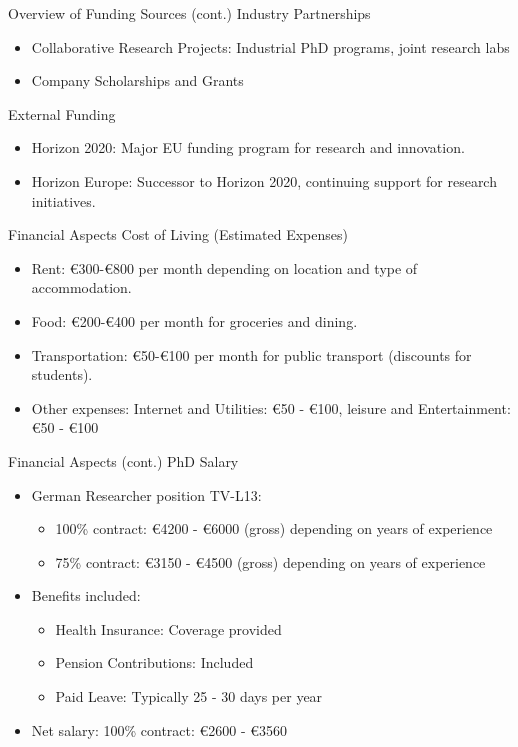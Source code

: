 \documentclass[10pt]{beamer}
\begin{document}
\begin{frame}[fragile]{Overview of Funding Sources (cont.)}
\alert{Industry Partnerships}
\begin{itemize}
	\item Collaborative Research Projects: Industrial PhD programs, joint research labs
	\item Company Scholarships and Grants
\end{itemize}
\alert{External Funding}
\begin{itemize}
	\item Horizon 2020: Major EU funding program for research and innovation.
	\item Horizon Europe: Successor to Horizon 2020, continuing support for research initiatives.
\end{itemize}
\end{frame}

\begin{frame}{Financial Aspects}
\alert{Cost of Living (Estimated Expenses)}
  \begin{itemize}
  	\item Rent: €300-€800 per month depending on location and type of accommodation.
	\item Food: €200-€400 per month for groceries and dining.
	\item Transportation: €50-€100 per month for public transport (discounts for students).
	\item Other expenses: Internet and Utilities: €50 - €100, leisure and Entertainment: €50 - €100
  \end{itemize}
\end{frame}

\begin{frame}{Financial Aspects (cont.)}
\alert{PhD Salary}
\begin{itemize}
	\item German Researcher position TV-L13: 
	\begin{itemize}
		\item 100\% contract: €4200 - €6000 (gross) depending on years of experience
		\item 75\% contract: €3150 - €4500 (gross) depending on years of experience
	\end{itemize}
	\item Benefits included:
	\begin{itemize}
		\item Health Insurance: Coverage provided
		\item Pension Contributions: Included
		\item Paid Leave: Typically 25 - 30 days per year
	\end{itemize}
	\item Net salary: 100\% contract: €2600 - €3560
\end{itemize}
\end{frame}
\end{document}
